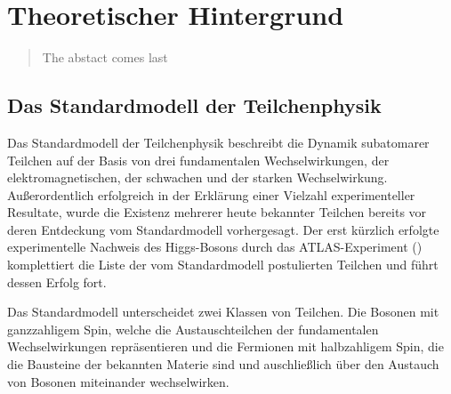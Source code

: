 


\chapter{Theoretischer Hintergrund}

\begin{quote}
    The abstact comes last
\end{quote}



\section{Das Standardmodell der Teilchenphysik}
\label{theory:standardmodell}


Das Standardmodell der Teilchenphysik beschreibt die Dynamik subatomarer
Teilchen auf der Basis von drei fundamentalen Wechselwirkungen, der
elektromagnetischen, der schwachen und der starken Wechselwirkung.
Außerordentlich erfolgreich in der Erklärung einer Vielzahl experimenteller
Resultate, wurde die Existenz mehrerer heute bekannter Teilchen bereits vor
deren Entdeckung vom Standardmodell vorhergesagt. Der erst kürzlich erfolgte
experimentelle Nachweis des Higgs-Bosons durch das ATLAS-Experiment
(\cite{Aad:2012tfa}) komplettiert die Liste der vom Standardmodell postulierten
Teilchen und führt dessen Erfolg fort.

Das Standardmodell unterscheidet zwei Klassen von Teilchen. Die Bosonen mit
ganzzahligem Spin, welche die Austauschteilchen der fundamentalen
Wechselwirkungen repräsentieren und die Fermionen mit halbzahligem Spin, die
die Bausteine der bekannten Materie sind und auschließlich über den Austauch
von Bosonen miteinander wechselwirken.  

